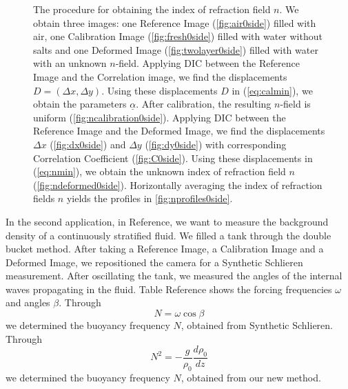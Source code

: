 \documentclass{article}
\begin{document}
\begin{figure}[htbp]
\caption{The procedure for obtaining the index of refraction field $n$. We obtain three images: one Reference Image (\ref{fig:air0side}) filled with air, one Calibration Image (\ref{fig:fresh0side}) filled with water without salts and one Deformed Image (\ref{fig:twolayer0side}) filled with water with an unknown $n$-field. Applying DIC between the Reference Image and the Correlation image, we find the displacements $D=(\Delta x, \Delta y)$. Using these displacements $D$ in (\ref{eq:calmin}), we obtain the parameters $\underline{\alpha}$. After calibration, the resulting $n$-field is uniform (\ref{fig:ncalibration0side}). Applying DIC between the Reference Image and the Deformed Image, we find the displacements $\Delta x$ (\ref{fig:dx0side}) and $\Delta y$ (\ref{fig:dy0side}) with corresponding Correlation Coefficient (\ref{fig:C0side}).  Using these displacements in (\ref{eq:nmin}), we obtain the unknown index of refraction field $n$ (\ref{fig:ndeformed0side}). Horizontally averaging the index of refraction fields $n$ yields the profiles in \ref{fig:nprofiles0side}.}
\label{fig:0side}
\end{figure}

In the second application, in Reference, we want to measure the background density of a continuously stratified fluid. We filled a tank through the double bucket method. After taking a Reference Image, a Calibration Image and a Deformed Image, we repositioned the camera for a Synthetic Schlieren measurement. After oscillating the tank, we measured the angles of the internal waves propagating in the fluid. Table Reference shows the forcing frequencies $\omega$ and angles $\beta$. Through
\begin{equation}
	N = \omega \cos \beta
\end{equation}
we determined the buoyancy frequency $N$, obtained from Synthetic Schlieren. Through
\begin{equation}
	N^2 = - \frac{g}{\rho_0}\frac{d \rho_0}{d z}
\end{equation}
we determined the buoyancy frequency $N$, obtained from our new method. 
\end{document}
